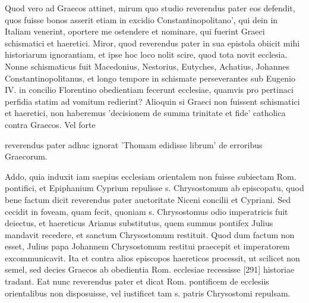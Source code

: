 Quod vero ad Graecos attinet, mirum quo studio reverendus pater eos defendit, quos fuisse bonos asserit etiam in excidio Constantinopolitano', qui dein in Italiam venerint, oportere me ostendere et nominare, qui fuerint Graeci schismatici et haeretici. Miror, quod reverendus pater in sua epistola obiicit mihi historiarum ignorantiam, et ipse hoc loco nolit scire, quod tota novit ecclesia. Nonne schismaticus fuit Macedonius, Nestorius, Eutyches, Achatius, Johannes Constantinopolitanus, et longo tempore in schismate perseverantes sub Eugenio IV. in concilio Florentino obedientiam fecerunt ecclesiae, quamvis pro pertinaci perfidia statim ad vomitum redierint? Alioquin si Graeci non fuissent schismatici et haeretici, non haberemus 'decisionem de summa trinitate et fide' catholica contra Graecos. Vel forte

reverendus pater adhuc ignorat 'Thomam edidisse librum' de erroribus Graecorum.

Addo, quia induxit iam saepius ecclesiam orientalem non fuisse subiectam Rom. pontifici, et Epiphanium Cyprium repulisse s. Chrysostomum ab episcopatu, quod bene factum dicit reverendus pater auctoritate Niceni concilii et Cypriani. Sed cecidit in foveam, quam fecit, quoniam s. Chrysostomus odio imperatricis fuit deiectus, et haereticus Arianus substitutus, quem summus pontifex Julius mandavit recedere, et sanctum Chrysostomum restituit. Quod dum factum non esset, Julius papa Johannem Chrysostomum restitui praecepit et imperatorem excommunicavit. Ita et contra alios episcopos haereticos processit, ut scilicet non semel, sed decies Graecos ab obedientia Rom. ecclesiae recessisse [291] historiae tradant. Eat nunc reverendus pater et dicat Rom. pontificem de ecclesiis orientalibus non disposuisse, vel iustificet tam s. patris Chrysostomi repulsam.

